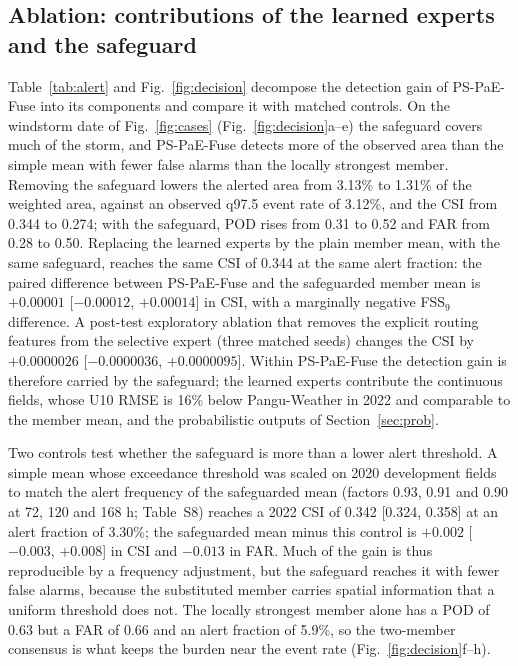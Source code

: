 \documentclass[12pt]{article}
\begin{document}
\subsection{Ablation: contributions of the learned experts and the safeguard}
\label{sec:ablation}

Table~\ref{tab:alert} and Fig.~\ref{fig:decision} decompose the detection gain of PS-PaE-Fuse into its components and compare it with matched controls. On the windstorm date of Fig.~\ref{fig:cases} (Fig.~\ref{fig:decision}a--e) the safeguard covers much of the storm, and PS-PaE-Fuse detects more of the observed area than the simple mean with fewer false alarms than the locally strongest member. Removing the safeguard lowers the alerted area from 3.13\% to 1.31\% of the weighted area, against an observed q97.5 event rate of 3.12\%, and the CSI from 0.344 to 0.274; with the safeguard, POD rises from 0.31 to 0.52 and FAR from 0.28 to 0.50. Replacing the learned experts by the plain member mean, with the same safeguard, reaches the same CSI of 0.344 at the same alert fraction: the paired difference between PS-PaE-Fuse and the safeguarded member mean is $+0.00001$ [$-0.00012$, $+0.00014$] in CSI, with a marginally negative FSS$_{9}$ difference. A post-test exploratory ablation that removes the explicit routing features from the selective expert (three matched seeds) changes the CSI by $+0.0000026$ [$-0.0000036$, $+0.0000095$]. Within PS-PaE-Fuse the detection gain is therefore carried by the safeguard; the learned experts contribute the continuous fields, whose U10 RMSE is 16\% below Pangu-Weather in 2022 and comparable to the member mean, and the probabilistic outputs of Section~\ref{sec:prob}.

Two controls test whether the safeguard is more than a lower alert threshold. A simple mean whose exceedance threshold was scaled on 2020 development fields to match the alert frequency of the safeguarded mean (factors 0.93, 0.91 and 0.90 at 72, 120 and 168 h; Table~S8) reaches a 2022 CSI of 0.342 [0.324, 0.358] at an alert fraction of 3.30\%; the safeguarded mean minus this control is $+0.002$ [$-0.003$, $+0.008$] in CSI and $-0.013$ in FAR. Much of the gain is thus reproducible by a frequency adjustment, but the safeguard reaches it with fewer false alarms, because the substituted member carries spatial information that a uniform threshold does not. The locally strongest member alone has a POD of 0.63 but a FAR of 0.66 and an alert fraction of 5.9\%, so the two-member consensus is what keeps the burden near the event rate (Fig.~\ref{fig:decision}f--h).
\end{document}
